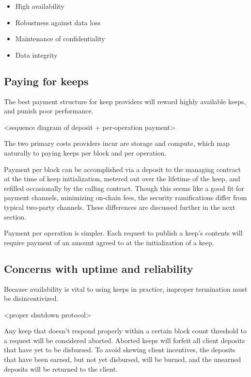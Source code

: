 \documentclass[11pt]{article}
\begin{document}
\begin{itemize}
  \item High availability
  \item Robustness against data loss
  \item Maintenance of confidentiality
  \item Data integrity
\end{itemize}

\subsection{Paying for keeps}

The best payment structure for keep providers will reward highly
available keeps, and punish poor performance.

<sequence diagram of deposit + per-operation payment>

The two primary costs providers incur are storage and compute, which
map naturally to paying keeps per block and per operation.

Payment per block can be accomplished via a deposit to the managing
contract at the time of keep initialization, metered out over the
lifetime of the keep, and refilled occasionally by the calling
contract. Though this seems like a good fit for payment channels,
minimizing on-chain fees, the security ramifications differ from
typical two-party channels. These differences are discussed further in
the next section.

Payment per operation is simpler. Each request to publish a keep's
contents will require payment of an amount agreed to at the
initialization of a keep.

\subsection{Concerns with uptime and reliability} \label{uptime}

Because availability is vital to using keeps in practice, improper
termination must be disincentivized.

<proper shutdown protocol>

Any keep that doesn't respond properly within a certain block count
threshold to a request will be considered aborted. Aborted keeps will
forfeit all client deposits that have yet to be disbursed. To avoid
skewing client incentives, the deposits that have been earned, but not
yet disbursed, will be burned, and the unearned deposits will be
returned to the client.
\end{document}
